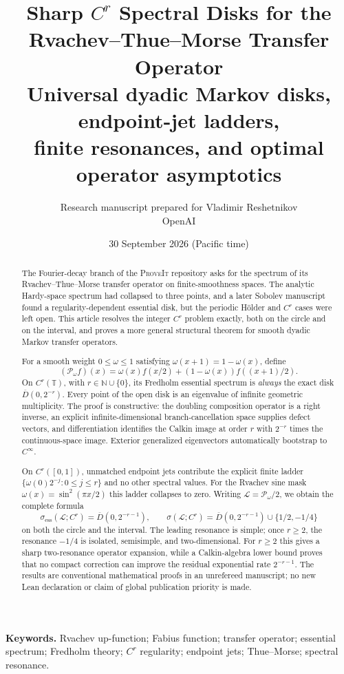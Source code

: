 \documentclass[11pt,a4paper]{article}
\title{\textbf{Sharp $C^r$ Spectral Disks for the\\Rvachev--Thue--Morse Transfer Operator}\\[0.55em]
\large Universal dyadic Markov disks, endpoint-jet ladders,\\
finite resonances, and optimal operator asymptotics}
\author{Research manuscript prepared for Vladimir Reshetnikov\\
\small OpenAI}
\date{30 September 2026 (Pacific time)}
\theoremstyle{definition}
\theoremstyle{remark}
\newcommand{\N}{\mathbb N}
\newcommand{\T}{\mathbb T}
\newcommand{\Dbar}[1]{\overline{D}(0,#1)}
\newcommand{\spec}{\sigma}
\newcommand{\spece}{\sigma_{\mathrm{ess}}}
\newcommand{\Lop}{\mathcal L}
\newcommand{\Pop}{\mathcal P}
\newcommand{\repo}{\textsc{ProveIt}}
\begin{document}
\color{ink}
\maketitle

\begin{abstract}
The Fourier-decay branch of the \repo{} repository asks for the spectrum of
its Rvachev--Thue--Morse transfer operator on finite-smoothness spaces.  The
analytic Hardy-space spectrum had collapsed to three points, and a later
Sobolev manuscript found a regularity-dependent essential disk, but the
periodic H\"older and $C^r$ cases were left open.  This article resolves the
integer $C^r$ problem exactly, both on the circle and on the interval, and
proves a more general structural theorem for smooth dyadic Markov transfer
operators.

For a smooth weight $0\leq\omega\leq1$ satisfying
$\omega(x+1)=1-\omega(x)$, define
\[
 (\Pop_\omega f)(x)=\omega(x)f(x/2)
 +(1-\omega(x))f((x+1)/2).
\]
On $C^r(\T)$, with $r\in\N\cup\{0\}$, its Fredholm essential spectrum is
\emph{always} the exact disk $\Dbar{2^{-r}}$.  Every point of the open disk
is an eigenvalue of infinite geometric multiplicity.  The proof is
constructive: the doubling composition operator is a right inverse, an
explicit infinite-dimensional branch-cancellation space supplies defect
vectors, and differentiation identifies the Calkin image at order $r$ with
$2^{-r}$ times the continuous-space image.  Exterior generalized
eigenvectors automatically bootstrap to $C^\infty$.

On $C^r([0,1])$, unmatched endpoint jets contribute the explicit finite
ladder $\{\omega(0)2^{-j}:0\leq j\leq r\}$ and no other spectral values.
For the Rvachev sine mask $\omega(x)=\sin^2(\pi x/2)$ this ladder collapses
to zero.  Writing $\Lop=\Pop_\omega/2$, we obtain the complete formula
\[
 \spece(\Lop;C^r)=\Dbar{2^{-r-1}},\qquad
 \spec(\Lop;C^r)=\Dbar{2^{-r-1}}\cup\{1/2,-1/4\}
\]
on both the circle and the interval.  The leading resonance is simple; once
$r\ge2$, the resonance $-1/4$ is isolated, semisimple, and two-dimensional.
For $r\ge2$ this gives a sharp two-resonance operator expansion, while a
Calkin-algebra lower bound proves that no compact correction can improve the
residual exponential rate $2^{-r-1}$.  The results are conventional
mathematical proofs in an unrefereed manuscript; no new Lean declaration or
claim of global publication priority is made.
\end{abstract}

\noindent\textbf{Keywords.}
Rvachev up-function; Fabius function; transfer operator; essential spectrum;
Fredholm theory; $C^r$ regularity; endpoint jets; Thue--Morse; spectral
resonance.
\end{document}
